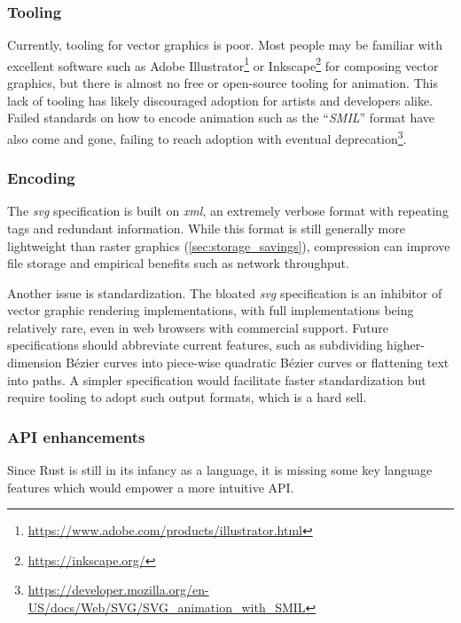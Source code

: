 \subsubsection{Tooling}
Currently, tooling for vector graphics is poor. Most people may be familiar with excellent software such as Adobe Illustrator\footnote{\href{https://www.adobe.com/products/illustrator.html}{https://www.adobe.com/products/illustrator.html}} or Inkscape\footnote{\href{https://inkscape.org/}{https://inkscape.org/}} for composing vector graphics, but there is almost no free or open-source tooling for animation. This lack of tooling has likely discouraged adoption for artists and developers alike. Failed standards on how to encode animation such as the ``\textit{SMIL}'' format have also come and gone, failing to reach adoption with eventual deprecation\footnote{\href{https://developer.mozilla.org/en-US/docs/Web/SVG/SVG_animation_with_SMIL}{https://developer.mozilla.org/en-US/docs/Web/SVG/SVG\_animation\_with\_SMIL}}.\medskip

\subsubsection{Encoding}
The \textit{svg} specification is built on \textit{xml}, an extremely verbose format with repeating tags and redundant information. While this format is still generally more lightweight than raster graphics (\cref{sec:storage_savings}), compression can improve file storage and empirical benefits such as network throughput.\medskip

Another issue is standardization. The bloated \textit{svg} specification is an inhibitor of vector graphic rendering implementations, with full implementations being relatively rare, even in web browsers with commercial support. Future specifications should abbreviate current features, such as subdividing higher-dimension Bézier curves into piece-wise quadratic Bézier curves or flattening text into paths. A simpler specification would facilitate faster standardization but require tooling to adopt such output formats, which is a hard sell.

\subsubsection{API enhancements}
Since Rust is still in its infancy as a language, it is missing some key language features which would empower a more intuitive API.\medskip

